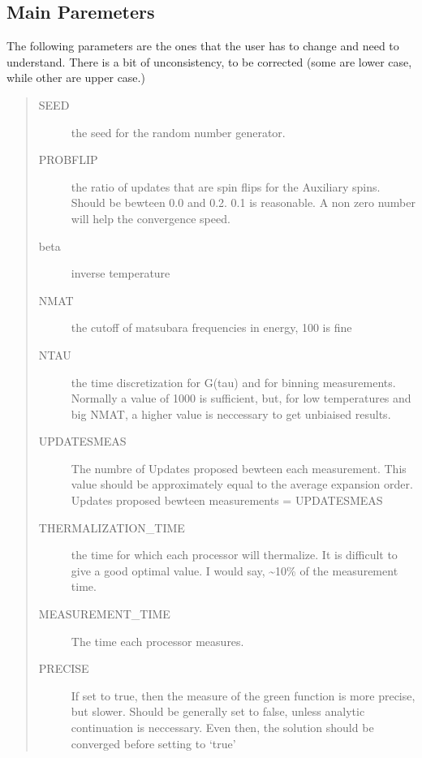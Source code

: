 \documentclass[letterpaper,10pt,english]{sphinxmanual}
\begin{document}
\subsection{Main Paremeters}
\label{\detokenize{params:main-paremeters}}
The following parameters are the ones that the user has to change and need to understand. There is a bit of unconsistency, to be corrected
(some are lower case, while other are upper case.)
\begin{quote}
\begin{description}
\item[{SEED}] \leavevmode
the seed for the random number generator.

\item[{PROBFLIP}] \leavevmode
the ratio of updates that are spin flips for the Auxiliary spins. Should be bewteen 0.0 and 0.2. 0.1 is reasonable.
A non zero number will help the convergence speed.

\item[{beta}] \leavevmode
inverse temperature

\item[{NMAT}] \leavevmode
the cutoff of matsubara frequencies in energy, 100 is fine

\item[{NTAU}] \leavevmode
the time discretization for G(tau) and for binning measurements. Normally
a value of 1000 is sufficient, but, for low temperatures and big NMAT,
a higher value is neccessary to get unbiaised results.

\item[{UPDATESMEAS}] \leavevmode
The numbre of Updates proposed bewteen each measurement.
This value should be approximately equal to the average expansion order.
Updates proposed bewteen measurements = UPDATESMEAS

\item[{THERMALIZATION\_TIME}] \leavevmode
the time for which each processor will thermalize. It is difficult to give a good
optimal value. I would say, \textasciitilde{}10\% of the measurement time.

\item[{MEASUREMENT\_TIME}] \leavevmode
The time each processor measures.

\item[{PRECISE}] \leavevmode
If set to true, then the measure of the green function is more precise, but slower. Should be generally set to false,
unless analytic continuation is neccessary. Even then, the solution should be converged before setting to `true'

\end{description}
\end{quote}
\end{document}
